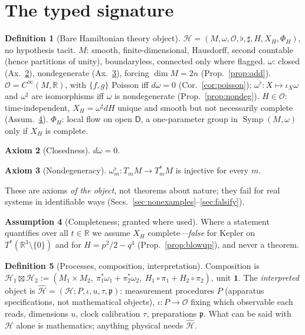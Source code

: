 \documentclass[12pt,a4paper]{article}
\theoremstyle{definition}
\newtheorem{definition}{Definition}[section]
\newtheorem{axiom}[definition]{Axiom}
\newtheorem{assumption}[definition]{Assumption}
\theoremstyle{plain}
\theoremstyle{commentary}
\newcommand{\R}{\mathbb{R}}
\newcommand{\Cinf}{C^{\infty}}
\newcommand{\Oc}{\mathcal{O}}
\newcommand{\Dsf}{\mathsf{D}}
\newcommand{\pt}{\mathbf{1}}
\newcommand{\Symp}{\operatorname{Symp}}
\newcommand{\sh}{\sharp}
\newcommand{\fl}{\flat}
\newcommand{\pb}[2]{\{#1,#2\}}
\newcommand{\Hb}{\mathcal{H}}
\newcommand{\Hhat}{\widehat{\mathcal{H}}}
\begin{document}
\section{The typed signature}
\label{sec:signature}

\begin{definition}[Bare Hamiltonian theory object]\label{def:bare}
$\Hb=(M,\omega,\Oc,\fl,\sh,H,X_H,\Phi_H)$, no hypothesis tacit. $M$: smooth, finite-dimensional,
Hausdorff, second countable (hence partitions of unity), boundaryless, connected only where flagged.
$\omega$: closed (Ax.~\ref{ax:closed}), nondegenerate (Ax.~\ref{ax:nondeg}), forcing $\dim M=2n$
(Prop.~\ref{prop:odd}). $\Oc=\Cinf(M,\R)$, with $\pb{f}{g}$ Poisson iff $d\omega=0$
(Cor.~\ref{cor:poisson}); $\omega^\fl:X\mapsto\iota_X\omega$ and $\omega^\sh$ are isomorphisms iff
$\omega$ is nondegenerate (Prop.~\ref{prop:nondeg}). $H\in\Oc$: time-independent, $X_H=\omega^\sh dH$
unique and smooth but not necessarily complete (Assum.~\ref{as:complete}). $\Phi_H$: local flow on
open $\Dsf$, a one-parameter group in $\Symp(M,\omega)$ only if $X_H$ is complete.
\end{definition}

\begin{axiom}[Closedness]\label{ax:closed} $d\omega=0$. \end{axiom}
\begin{axiom}[Nondegeneracy]\label{ax:nondeg}
$\omega^\fl_m:T_mM\to T^*_mM$ is injective for every $m$.
\end{axiom}

\noindent These are axioms \emph{of the object}, not theorems about nature; they fail for real
systems in identifiable ways (Secs.~\ref{sec:nonexamples}--\ref{sec:falsify}).\begin{assumption}[Completeness; granted where used]\label{as:complete}
Where a statement quantifies over all $t\in\R$ we assume $X_H$ complete---\emph{false} for Kepler on
$T^*(\R^3\setminus\{0\})$ and for $H=p^2/2-q^4$ (Prop.~\ref{prop:blowup}), and never a theorem.
\end{assumption}

\begin{definition}[Processes, composition, interpretation]\label{def:proc}
Composition is $\Hb_1\boxtimes\Hb_2:=(M_1\times M_2,\ \pi_1^*\omega_1+\pi_2^*\omega_2,\
H_1\circ\pi_1+H_2\circ\pi_2)$, unit $\pt$. The \emph{interpreted} object is
$\Hhat=(\Hb;P,\iota,u,\tau,\mathfrak{p})$: measurement procedures $P$ (apparatus specifications, not
mathematical objects), $\iota:P\to\Oc$ fixing which observable each reads, dimensions $u$, clock
calibration $\tau$, preparations $\mathfrak{p}$. What can be said with $\Hb$ alone is mathematics;
anything physical needs $\Hhat$.
\end{definition}
\end{document}
